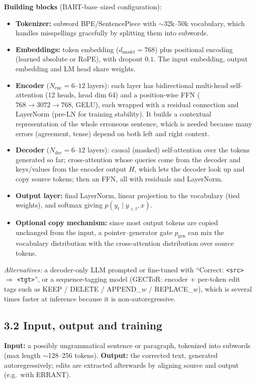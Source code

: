 \documentclass[11pt]{article}
\begin{document}
\textbf{Building blocks} (BART-base--sized configuration):
\begin{itemize}[leftmargin=1.5em]
\item \textbf{Tokenizer:} subword BPE/SentencePiece with $\sim$32k--50k vocabulary, which handles misspellings gracefully by splitting them into subwords.
\item \textbf{Embeddings:} token embedding ($d_{\text{model}}=768$) plus positional encoding (learned absolute or RoPE), with dropout $0.1$. The input embedding, output embedding and LM head share weights.
\item \textbf{Encoder} ($N_{\text{enc}}=6$--$12$ layers): each layer has bidirectional multi-head self-attention (12 heads, head dim 64) and a position-wise FFN ($768\to3072\to768$, GELU), each wrapped with a residual connection and LayerNorm (pre-LN for training stability). It builds a contextual representation of the whole erroneous sentence, which is needed because many errors (agreement, tense) depend on both left and right context.
\item \textbf{Decoder} ($N_{\text{dec}}=6$--$12$ layers): causal (masked) self-attention over the tokens generated so far; cross-attention whose queries come from the decoder and keys/values from the encoder output $H$, which lets the decoder look up and copy source tokens; then an FFN, all with residuals and LayerNorm.
\item \textbf{Output layer:} final LayerNorm, linear projection to the vocabulary (tied weights), and softmax giving $p(y_t\mid y_{<t},x)$.
\item \textbf{Optional copy mechanism:} since most output tokens are copied unchanged from the input, a pointer--generator gate $p_{\text{gen}}$ can mix the vocabulary distribution with the cross-attention distribution over source tokens.
\end{itemize}
\emph{Alternatives:} a decoder-only LLM prompted or fine-tuned with ``Correct: \texttt{<src>} $\Rightarrow$ \texttt{<tgt>}'', or a sequence-tagging model (GECToR: encoder + per-token edit tags such as KEEP / DELETE / APPEND\_$w$ / REPLACE\_$w$), which is several times faster at inference because it is non-autoregressive.

\subsection*{3.2 Input, output and training}

\textbf{Input:} a possibly ungrammatical sentence or paragraph, tokenized into subwords (max length $\sim$128--256 tokens). \textbf{Output:} the corrected text, generated autoregressively; edits are extracted afterwards by aligning source and output (e.g.\ with ERRANT).
\end{document}
